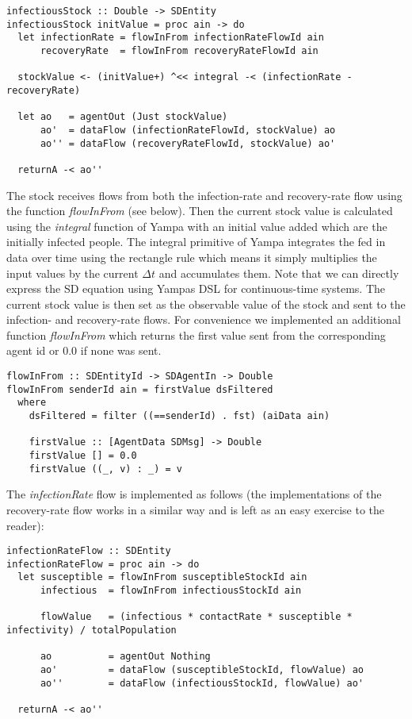 \begin{verbatim}
infectiousStock :: Double -> SDEntity
infectiousStock initValue = proc ain -> do
  let infectionRate = flowInFrom infectionRateFlowId ain
      recoveryRate  = flowInFrom recoveryRateFlowId ain

  stockValue <- (initValue+) ^<< integral -< (infectionRate - recoveryRate)
  
  let ao   = agentOut (Just stockValue)
      ao'  = dataFlow (infectionRateFlowId, stockValue) ao
      ao'' = dataFlow (recoveryRateFlowId, stockValue) ao'
      
  returnA -< ao''
\end{verbatim}

The stock receives flows from both the infection-rate and recovery-rate flow using the function \textit{flowInFrom} (see below). Then the current stock value is calculated using the \textit{integral} function of Yampa with an initial value added which are the initially infected people. The integral primitive of Yampa integrates the fed in data over time using the rectangle rule which means it simply multiplies the input values by the current $\Delta t$ and accumulates them. Note that we can directly express the SD equation using Yampas DSL for continuous-time systems. The current stock value is then set as the observable value of the stock and sent to the infection- and recovery-rate flows. For convenience we implemented an additional function \textit{flowInFrom} which returns the first value sent from the corresponding agent id or 0.0 if none was sent.

\begin{verbatim}
flowInFrom :: SDEntityId -> SDAgentIn -> Double
flowInFrom senderId ain = firstValue dsFiltered
  where 
    dsFiltered = filter ((==senderId) . fst) (aiData ain)

    firstValue :: [AgentData SDMsg] -> Double
    firstValue [] = 0.0
    firstValue ((_, v) : _) = v
\end{verbatim}
	
The \textit{infectionRate} flow is implemented as follows (the implementations of the recovery-rate flow works in a similar way and is left as an easy exercise to the reader):

\begin{verbatim}
infectionRateFlow :: SDEntity
infectionRateFlow = proc ain -> do
  let susceptible = flowInFrom susceptibleStockId ain 
      infectious  = flowInFrom infectiousStockId ain

      flowValue   = (infectious * contactRate * susceptible * infectivity) / totalPopulation
  
      ao          = agentOut Nothing
      ao'         = dataFlow (susceptibleStockId, flowValue) ao
      ao''        = dataFlow (infectiousStockId, flowValue) ao'
      
  returnA -< ao''
\end{verbatim}

